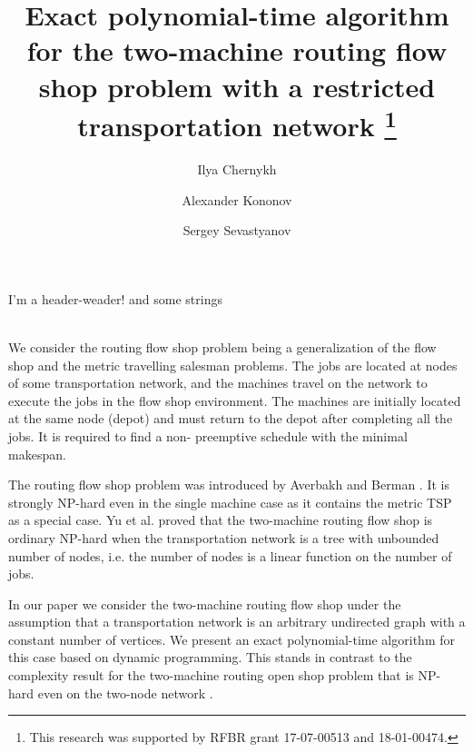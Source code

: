 I'm a header-weader!
and some strings
%
%
\title{Exact polynomial-time algorithm for the two-machine routing flow shop problem with a restricted transportation network
\thanks{This research was supported by RFBR grant 17-07-00513 and 18-01-00474.} }
%
%
\author{Ilya Chernykh \and
Alexander Kononov \and
Sergey Sevastyanov} 
%
%
%

\maketitle              %

\\

We consider the routing flow shop problem being a generalization of the flow shop and the metric travelling salesman problems.
The jobs are located at nodes of some transportation network, and the machines travel on the network to execute the jobs in the flow shop environment. 
The machines are initially located at the same node (depot) and must return to the depot after completing all the jobs. 
It is required to find a non- preemptive schedule with the minimal makespan.

The routing flow shop problem was introduced by Averbakh and Berman \cite{AverbakhBerman}. 
It is strongly NP-hard even in the single machine case as it contains the metric TSP as a special case.
Yu et al. \cite{Yu} proved that the two-machine routing flow shop is ordinary NP-hard when the transportation network is a tree
with unbounded number of nodes, i.e. the number of nodes is a linear function on the number of jobs.

In our paper we consider the two-machine routing flow shop under the assumption that a transportation network is an arbitrary undirected graph with a constant number of vertices. 
We present an exact polynomial-time algorithm for this case based on dynamic programming. 
This stands in contrast to the complexity result for the two-machine routing open shop problem
that is NP-hard even on the two-node network \cite{ABC}.






